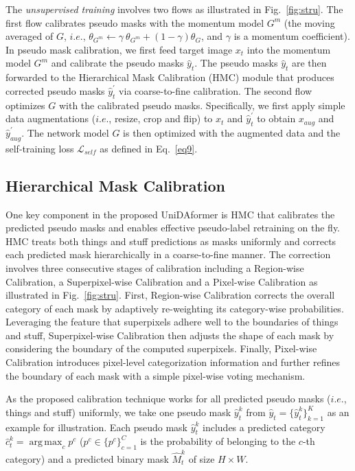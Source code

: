\documentclass[10pt,twocolumn,letterpaper]{article}
\DeclareMathOperator*{\argmax}{arg\,max}
\begin{document}
The \textit{unsupervised training} involves two flows as illustrated in Fig.~\ref{fig:stru}. The first flow calibrates pseudo masks with the momentum model $G^m$ (the moving averaged of $G$, $i.e.$, $\theta_{G^m} \leftarrow \gamma \ \theta_{G^m} + (1 - \gamma) \theta_{G}$, and $\gamma$ is a momentum coefficient). In pseudo mask calibration, we first feed target image $x_t$ into the momentum model $G^m$ and calibrate the pseudo masks $\hat{y}_t$.
The pseudo masks $\hat{y}_t$ are then forwarded to the Hierarchical Mask Calibration (HMC) module that produces corrected pseudo masks $\hat{y}_t^{\prime}$ via coarse-to-fine calibration. The second flow optimizes $G$ with the calibrated pseudo masks. Specifically, we first apply simple data augmentations ($i.e.$, resize, crop and flip) to $x_t$ and $\hat{y}_t^{\prime}$ to obtain $x_{aug}$ and $\hat{y}_{aug}^{\prime}$. The network model $G$ is then optimized with the augmented data and the self-training loss $\mathcal{L}_{self}$ as defined in Eq.~\ref{eq9}.

\subsection{Hierarchical Mask Calibration}

One key component in the proposed UniDAformer is HMC that calibrates the predicted pseudo masks and enables effective pseudo-label retraining on the fly.
HMC treats both things and stuff predictions as masks uniformly and corrects each predicted mask hierarchically in a coarse-to-fine manner. The correction involves three consecutive stages of calibration including a Region-wise Calibration, a Superpixel-wise Calibration and a Pixel-wise Calibration as illustrated in Fig.~\ref{fig:stru}.
First, Region-wise Calibration corrects the overall category of each mask by adaptively re-weighting its category-wise probabilities.
Leveraging the feature that superpixels adhere well to the boundaries of things and stuff, Superpixel-wise Calibration then adjusts the shape of each mask by considering the boundary of the computed superpixels.
Finally, Pixel-wise Calibration introduces pixel-level categorization information and further refines the boundary of each mask with a simple pixel-wise voting mechanism.

As the proposed calibration technique works for all predicted pseudo masks ($i.e.$, things and stuff) uniformly, we take one pseudo mask $\hat{y}_t^{k}$ from $\hat{y}_t = \{ \hat{y}_t^{k} \}_{k=1}^{K}$ as an example for illustration. Each pseudo mask $\hat{y}_t^{k}$ includes a predicted category $\hat{c}_t^k = \argmax_c p^{c}$ ($p^{c} \in \{ p^{c} \}_{c=1}^{C}$ is the probability of belonging to the $c$-th category) and a predicted binary mask $\hat{M}_t^k$ of size $H \times W$.
\end{document}
